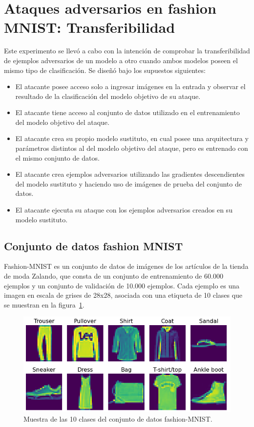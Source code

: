 \section{Ataques adversarios en fashion MNIST: Transferibilidad}
Este experimento se llevó a cabo con la intención de comprobar la transferibilidad \parencite{r4} de ejemplos adversarios de un modelo a otro cuando ambos modelos poseen el mismo tipo de clasificación. Se diseñó bajo los supuestos siguientes:
\begin{itemize}
    \item El atacante posee acceso solo a ingresar imágenes en la entrada y observar el resultado de la clasificación del modelo objetivo de su ataque.
    \item El atacante tiene acceso al conjunto de datos utilizado en el entrenamiento del modelo objetivo del ataque.
    \item El atacante crea su propio modelo sustituto, en cual posee una arquitectura y parámetros distintos al del modelo objetivo del ataque, pero es entrenado con el mismo conjunto de datos.
    \item El atacante crea ejemplos adversarios utilizando las gradientes descendientes del modelo sustituto y haciendo uso de imágenes de prueba del conjunto de datos.
    \item El atacante ejecuta su ataque con los ejemplos adversarios creados en su modelo sustituto.
\end{itemize}


\subsection{Conjunto de datos fashion MNIST}
Fashion-MNIST es un conjunto de datos de imágenes de los artículos de la tienda de moda Zalando, que consta de un conjunto de entrenamiento de 60.000 ejemplos y un conjunto de validación de 10.000 ejemplos. Cada ejemplo es una imagen en escala de grises de 28x28, asociada con una etiqueta de 10 clases que se muestran en la figura~\ref{fig:36}.

\begin{figure}[!h]
\centering
\includegraphics[scale = 0.92]{Figures/figura_36.PNG}
\decoRule
\caption[Redes generativas con adversario (GAN) como defensas]{Muestra de las 10 clases del conjunto de datos fashion-MNIST.}
\label{fig:36}
\end{figure}

